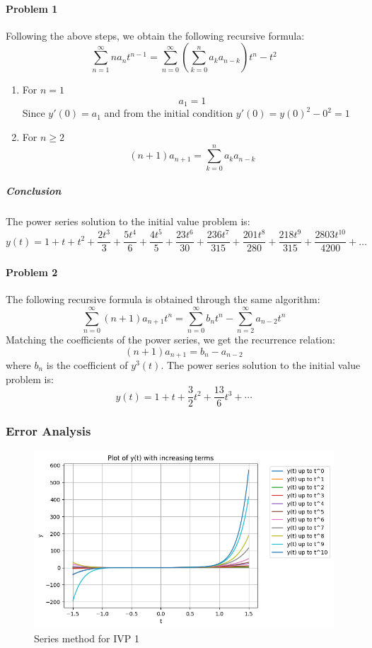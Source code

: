 \documentclass{article}
\begin{document}
\paragraph{Problem 1}
Following the above steps, we obtain the following recursive formula:
\[ \sum_{n=1}^{\infty} n a_n t^{n-1} = \sum_{n=0}^{\infty} \left( \sum_{k=0}^{n} a_k a_{n-k} \right) t^n - t^2 \] 

\begin{enumerate}
    \item For \( n=1 \)
       \[ a_1 = 1 \]
   Since \( y'(0) = a_1 \) and from the initial condition \( y'(0) = y(0)^2 - 0^2 = 1 \)
    \item For \( n \geq 2 \)
        \[ (n+1) a_{n+1} = \sum_{k=0}^{n} a_k a_{n-k} \] 
\end{enumerate}

\subparagraph{Conclusion}
The power series solution to the initial value problem is:
\[y(t) = 1 + t + t^2 + \frac{2t^3}{3} + \frac{5t^4}{6} + \frac{4t^5}{5} + \frac{23t^6}{30} + \frac{236t^7}{315} + \frac{201t^8}{280} + \frac{218t^9}{315} + \frac{2803t^{10}}{4200} + \ldots
\]

\paragraph{Problem 2}
The following recursive formula is obtained through the same algorithm:
\[
\sum_{n=0}^{\infty} (n+1) a_{n+1} t^n = \sum_{n=0}^{\infty} b_n t^n - \sum_{n=2}^{\infty} a_{n-2} t^n
\]
Matching the coefficients of the power series, we get the recurrence relation:
\[
(n+1) a_{n+1} = b_n - a_{n-2}
\]
where \( b_n \) is the coefficient of \( y^3(t) \).
The power series solution to the initial value problem is:
\[ y(t) = 1 + t + \frac{3}{2} t^2 + \frac{13}{6} t^3 + \cdots \]

\subsubsection{Error Analysis}

\begin{figure}[h]
    \centering
    \includegraphics[width=0.6\linewidth]{pic学长/1.png}
    \caption{Series method for IVP 1}
    \label{fig:IVP 1}
\end{figure}
\end{document}
